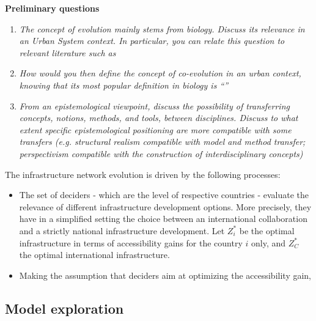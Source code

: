 \documentclass[11pt]{article}
\begin{document}
\bigskip

\textbf{Preliminary questions}

\begin{enumerate}
	\item \textit{The concept of evolution mainly stems from biology. Discuss its relevance in an Urban System context. In particular, you can relate this question to relevant literature such as \cite{}} %
	\item \textit{How would you then define the concept of co-evolution in an urban context, knowing that its most popular definition in biology is ``''}%
 	\item \textit{From an epistemological viewpoint, discuss the possibility of transferring concepts, notions, methods, and tools, between disciplines. Discuss to what extent specific epistemological positioning are more compatible with some transfers (e.g. structural realism compatible with model and method transfer; perspectivism compatible with the construction of interdisciplinary concepts)} %
\end{enumerate}

\bigskip

The infrastructure network evolution is driven by the following processes:

\begin{itemize}
	\item The set of deciders - which are the level of respective countries - evaluate the relevance of different infrastructure development options. More precisely, they have in a simplified setting the choice between an international collaboration and a strictly national infrastructure development. Let $Z^{\ast}_i$ be the optimal infrastructure in terms of accessibility gains for the country $i$ only, and $Z^{\ast}_C$ the optimal international infrastructure.
	\item Making the assumption that deciders aim at optimizing the accessibility gain, 
\end{itemize}







\subsection*{Model exploration}












	
\end{document}
